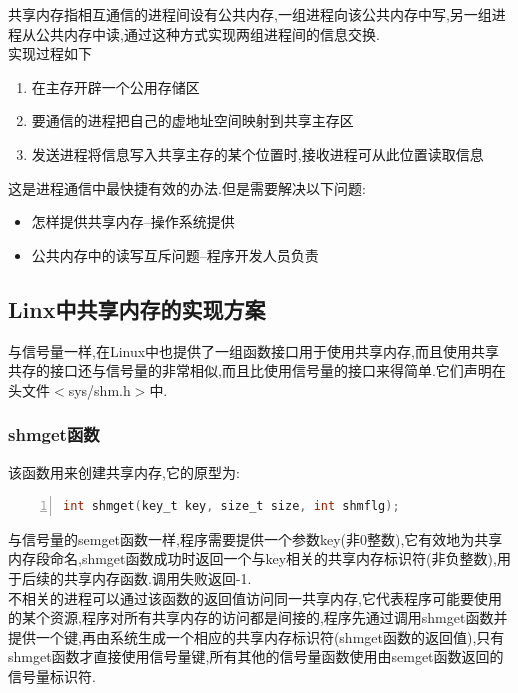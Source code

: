 \documentclass[a4paper,12pt,notitlepage]{article}
\begin{document}
	共享内存指相互通信的进程间设有公共内存,一组进程向该公共内存中写,另一组进程从公共内存中读,通过这种方式实现两组进程间的信息交换. \\
	
	实现过程如下
	
\begin{enumerate}
	\item 在主存开辟一个公用存储区
	\item 要通信的进程把自己的虚地址空间映射到共享主存区
	\item 发送进程将信息写入共享主存的某个位置时,接收进程可从此位置读取信息
\end{enumerate}

	这是进程通信中最快捷有效的办法.但是需要解决以下问题:
	
\begin{itemize}
	\item 怎样提供共享内存--操作系统提供
	\item 公共内存中的读写互斥问题--程序开发人员负责
\end{itemize}

\subsection{Linx中共享内存的实现方案}

	与信号量一样,在Linux中也提供了一组函数接口用于使用共享内存,而且使用共享共存的接口还与信号量的非常相似,而且比使用信号量的接口来得简单.它们声明在头文件$<$sys/shm.h$>$中.\\

\subsubsection{shmget函数}

	该函数用来创建共享内存,它的原型为:
	
\begin{lstlisting}[frame=shadowbox,numbers=left,language=C]
int shmget(key_t key, size_t size, int shmflg);
\end{lstlisting}

	与信号量的semget函数一样,程序需要提供一个参数key(非0整数),它有效地为共享内存段命名,shmget函数成功时返回一个与key相关的共享内存标识符(非负整数),用于后续的共享内存函数.调用失败返回-1. \\

	不相关的进程可以通过该函数的返回值访问同一共享内存,它代表程序可能要使用的某个资源,程序对所有共享内存的访问都是间接的,程序先通过调用shmget函数并提供一个键,再由系统生成一个相应的共享内存标识符(shmget函数的返回值),只有shmget函数才直接使用信号量键,所有其他的信号量函数使用由semget函数返回的信号量标识符.\\
\end{document}
